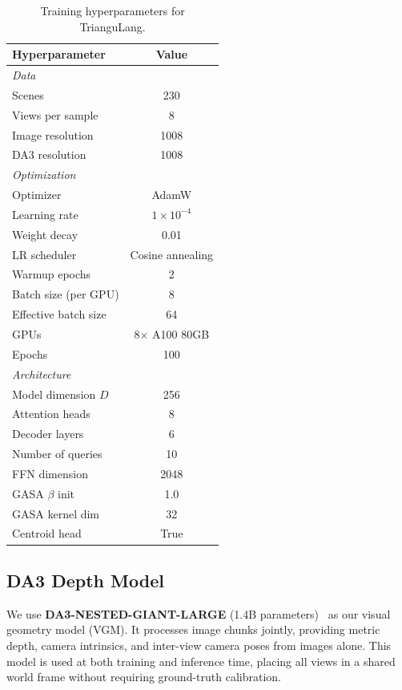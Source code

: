 \begin{table}[h]
\centering
\caption{Training hyperparameters for TrianguLang.}
\label{tab:hyperparams}
\small
\begin{tabular}{@{}lc@{}}
\toprule
\textbf{Hyperparameter} & \textbf{Value} \\
\midrule
\multicolumn{2}{l}{\textit{Data}} \\
\quad Scenes & 230 \\
\quad Views per sample & 8 \\
\quad Image resolution & 1008 \\
\quad DA3 resolution & 1008 \\
\midrule
\multicolumn{2}{l}{\textit{Optimization}} \\
\quad Optimizer & AdamW \\
\quad Learning rate & $1 \times 10^{-4}$ \\
\quad Weight decay & 0.01 \\
\quad LR scheduler & Cosine annealing \\
\quad Warmup epochs & 2 \\
\quad Batch size (per GPU) & 8 \\
\quad Effective batch size & 64 \\
\quad GPUs & 8$\times$ A100 80GB \\
\quad Epochs & 100 \\
\midrule
\multicolumn{2}{l}{\textit{Architecture}} \\
\quad Model dimension $D$ & 256 \\
\quad Attention heads & 8 \\
\quad Decoder layers & 6 \\
\quad Number of queries & 10 \\
\quad FFN dimension & 2048 \\
\quad GASA $\beta$ init & 1.0 \\
\quad GASA kernel dim & 32 \\
\quad Centroid head & True \\
\bottomrule
\end{tabular}
\end{table}

\subsection{DA3 Depth Model}

We use \textbf{DA3-NESTED-GIANT-LARGE} (1.4B parameters)~\cite{da3} as our visual geometry model (VGM). It processes image chunks jointly, providing metric depth, camera intrinsics, and inter-view camera poses from images alone. This model is used at both training and inference time, placing all views in a shared world frame without requiring ground-truth calibration.

